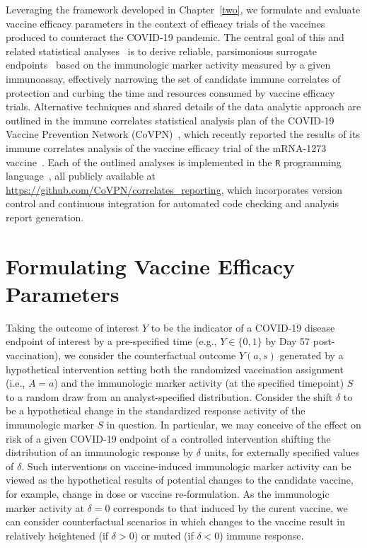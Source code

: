 Leveraging the framework developed in Chapter~\ref{two}, we formulate and
evaluate vaccine efficacy parameters in the context of efficacy trials of the
vaccines produced to counteract the COVID-19 pandemic. The central goal of this
and related statistical analyses~\citep[e.g.,][]{benkeser2021inference,
gilbert2021assessment} is to derive reliable, parsimonious surrogate
endpoints~\citep{prentice1989surrogate, gilbert2008evaluating} based on the
immunologic marker activity measured by a given immunoassay, effectively
narrowing the set of candidate immune correlates of protection and curbing the
time and resources consumed by vaccine efficacy trials. Alternative techniques
and shared details of the data analytic approach are outlined in the immune
correlates statistical analysis plan of the COVID-19 Vaccine Prevention Network
(CoVPN)~\citep{gilbert2021covpn}, which recently reported the results of its
immune correlates analysis of the vaccine efficacy trial of the mRNA-1273
vaccine~\citep{baden2021efficacy,gilbert2021immune}. Each of the outlined
analyses is implemented in the \texttt{R} programming language~\citep{R}, all
publicly available at \url{https://github.com/CoVPN/correlates_reporting}, which
incorporates version control and continuous integration for automated code
checking and analysis report generation.

\section{Formulating Vaccine Efficacy Parameters}

Taking the outcome of interest $Y$ to be the indicator of a COVID-19 disease
endpoint of interest by a pre-specified time (e.g., $Y \in \{0, 1\}$ by Day 57
post-vaccination), we consider the counterfactual outcome $Y(a,s)$ generated by
a hypothetical intervention setting both the randomized vaccination assignment
(i.e., $A = a$) and the immunologic marker activity (at the specified timepoint)
$S$ to a random draw from an analyst-specified distribution. Consider the shift
$\delta$ to be a hypothetical change in the standardized response activity of
the immunologic marker $S$ in question. In particular, we may conceive of the
effect on risk of a given COVID-19 endpoint of a controlled intervention
shifting the distribution of an immunologic response by $\delta$ units, for
externally specified values of $\delta$. Such interventions on vaccine-induced
immunologic marker activity can be viewed as the hypothetical results of
potential changes to the candidate vaccine, for example, change in dose or
vaccine re-formulation. As the immunologic marker activity at $\delta = 0$
corresponds to that induced by the curent vaccine, we can consider
counterfactual scenarios in which changes to the vaccine result in relatively
heightened (if $\delta > 0$) or muted (if $\delta < 0$) immune response.


